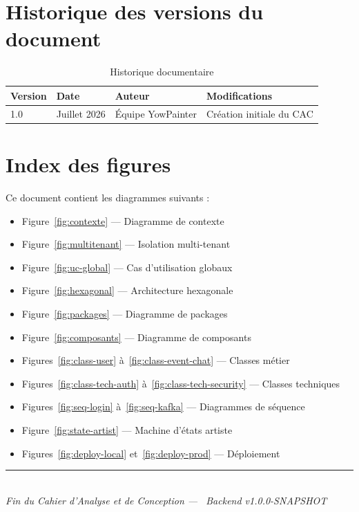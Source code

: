 \section{Historique des versions du document}

\begin{table}[h]
  \centering
  \caption{Historique documentaire}
  \label{tab:history}
  \begin{tabular}{@{}llll@{}}
    \toprule
    \textbf{Version} & \textbf{Date} & \textbf{Auteur} & \textbf{Modifications} \\
    \midrule
    1.0 & Juillet 2026 & Équipe YowPainter & Création initiale du CAC \\
    \bottomrule
  \end{tabular}
\end{table}

\section{Index des figures}

Ce document contient les diagrammes suivants :

\begin{itemize}[noitemsep]
  \item Figure~\ref{fig:contexte} — Diagramme de contexte
  \item Figure~\ref{fig:multitenant} — Isolation multi-tenant
  \item Figure~\ref{fig:uc-global} — Cas d'utilisation globaux
  \item Figure~\ref{fig:hexagonal} — Architecture hexagonale
  \item Figure~\ref{fig:packages} — Diagramme de packages
  \item Figure~\ref{fig:composants} — Diagramme de composants
  \item Figures~\ref{fig:class-user} à~\ref{fig:class-event-chat} — Classes métier
  \item Figures~\ref{fig:class-tech-auth} à~\ref{fig:class-tech-security} — Classes techniques
  \item Figures~\ref{fig:seq-login} à~\ref{fig:seq-kafka} — Diagrammes de séquence
  \item Figure~\ref{fig:state-artist} — Machine d'états artiste
  \item Figures~\ref{fig:deploy-local} et~\ref{fig:deploy-prod} — Déploiement
\end{itemize}

\vfill
\begin{center}
  \rule{0.5\textwidth}{0.4pt}\\[0.5em]
  \textit{Fin du Cahier d'Analyse et de Conception — \yow\ Backend v1.0.0-SNAPSHOT}
\end{center}
